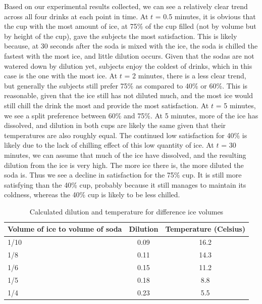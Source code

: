 \documentclass[oneside,12pt]{report}
\begin{document}
Based on our experimental results collected, we can see a relatively clear trend across all four drinks at each point in time. 
\vspace{12pt}
\newline
At $t$ = 0.5 minutes, it is obvious that the cup with the most amount of ice, at 75\% of the cup filled (not by volume but by height of the cup), gave the subjects the most satisfaction. This is likely because, at 30 seconds after the soda is mixed with the ice, the soda is chilled the fastest with the most ice, and little dilution occurs. Given that the sodas are not watered down by dilution yet, subjects enjoy the coldest of drinks, which in this case is the one with the most ice. 
\vspace{12pt}
\newline
At $t$ = 2 minutes, there is a less clear trend, but generally the subjects still prefer 75\% as compared to 40\% or 60\%. This is reasonable, given that the ice still has not diluted much, and the most ice would still chill the drink the most and provide the most satisfaction. 
\vspace{12pt}
\newline
At $t$ = 5 minutes, we see a split preference between 60\% and 75\%. At 5 minutes, more of the ice has dissolved, and dilution in both cups are likely the same given that their temperatures are also roughly equal. The continued low satisfaction for 40\% is likely due to the lack of chilling effect of this low quantity of ice.
\vspace{12pt}
\newline
At $t$ = 30 minutes, we can assume that much of the ice have dissolved, and the resulting dilution from the ice is very high. The more ice there is, the more diluted the soda is. Thus we see a decline in satisfaction for the 75\% cup. It is still more satisfying than the 40\% cup, probably because it still manages to maintain its coldness, whereas the 40\% cup is likely to be less chilled. 



\newpage

\begin{table}[ h]
\centering
\begin{tabular}{ l || c|c}
 Volume of ice to volume of soda &Dilution &Temperature (Celsius) \\
\hline  
1/10 & 0.09&16.2\\ 
\hline  
1/8 & 0.11&14.3\\ 
\hline 
1/6 & 0.15&11.2\\ 
\hline 
1/5 & 0.18&8.8\\ 
\hline 
1/4 & 0.23&5.5\\ 
\hline    
\end{tabular}
\caption{Calculated dilution and temperature for difference ice volumes}
\label{DilTempTable}
\end{table}
\end{document}
